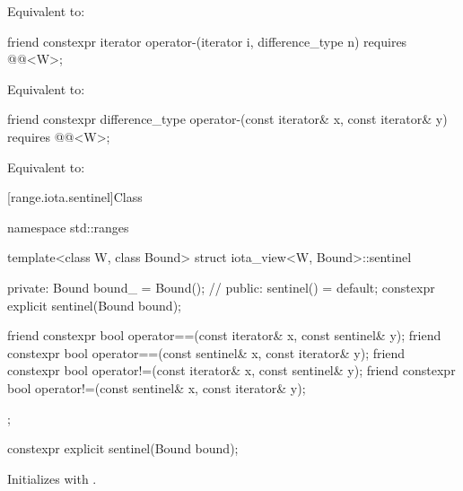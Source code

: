 \begin{itemdescr}
\pnum
\effects Equivalent to: 
\end{itemdescr}

\begin{itemdecl}
friend constexpr iterator operator-(iterator i, difference_type n)
  requires @@<W>;
\end{itemdecl}

\begin{itemdescr}
\pnum
\effects Equivalent to: 
\end{itemdescr}

\begin{itemdecl}
friend constexpr difference_type operator-(const iterator& x, const iterator& y)
  requires @@<W>;
\end{itemdecl}

\begin{itemdescr}
\pnum
\effects Equivalent to: 
\end{itemdescr}

[range.iota.sentinel]{Class }

\begin{codeblock}
namespace std::ranges {
  template<class W, class Bound>
  struct iota_view<W, Bound>::sentinel {
  private:
    Bound bound_ = Bound();     // \expos
  public:
    sentinel() = default;
    constexpr explicit sentinel(Bound bound);

    friend constexpr bool operator==(const iterator& x, const sentinel& y);
    friend constexpr bool operator==(const sentinel& x, const iterator& y);
    friend constexpr bool operator!=(const iterator& x, const sentinel& y);
    friend constexpr bool operator!=(const sentinel& x, const iterator& y);
  };
}
\end{codeblock}

\begin{itemdecl}
constexpr explicit sentinel(Bound bound);
\end{itemdecl}

\begin{itemdescr}
\pnum
\effects Initializes  with .
\end{itemdescr}

